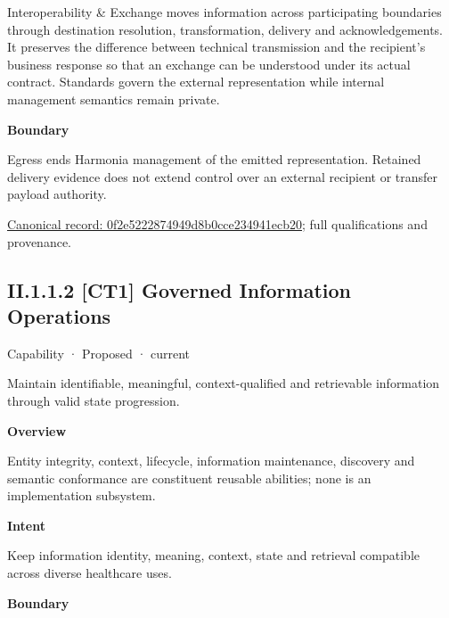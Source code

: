 Interoperability \& Exchange moves information across participating boundaries through destination resolution, transformation, delivery and acknowledgements. It preserves the difference between technical transmission and the recipient's business response so that an exchange can be understood under its actual contract. Standards govern the external representation while internal management semantics remain private.



\textbf{Boundary}



Egress ends Harmonia management of the emitted representation. Retained delivery evidence does not extend control over an external recipient or transfer payload authority.


{\footnotesize \href{../../../../../../../continuum/strategy/capability/0f2e5222874949d8b0cce234941ecb20.md}{Canonical record: 0f2e5222874949d8b0cce234941ecb20}; full qualifications and provenance.}\par
\subsection*{II.1.1.2 [CT1] Governed Information Operations}
\label{navigation:II.1.1.2}

\label{element:15e57021490c4e738aee9009ff84a7c3}
{\small Capability · Proposed · current}\par

Maintain identifiable, meaningful, context-qualified and retrievable information through valid state progression.



\textbf{Overview}



Entity integrity, context, lifecycle, information maintenance, discovery and semantic conformance are constituent reusable abilities; none is an implementation subsystem.



\textbf{Intent}



Keep information identity, meaning, context, state and retrieval compatible across diverse healthcare uses.



\textbf{Boundary}



